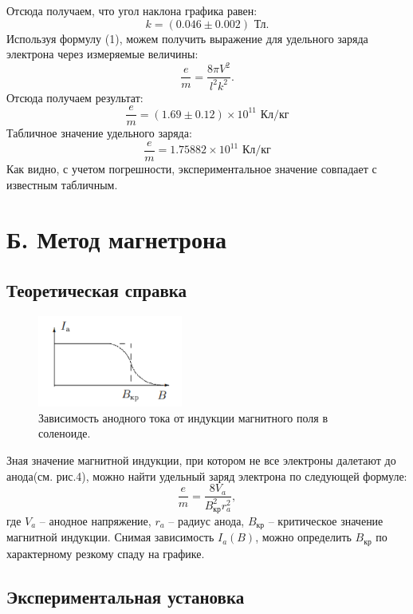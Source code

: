 \documentclass[a4paper, 14pt]{extarticle}%
\newcommand\ECaption[1]{%
     \captionsetup{font=footnotesize}%
     \caption{#1}}
\begin{document}
Отсюда получаем, что угол наклона графика равен:
\[k = (0.046\pm 0.002)\text{ Тл}.\]
Используя формулу (1), можем получить выражение для удельного заряда электрона через измеряемые величины:
\begin{equation}
\frac{e}{m}=\dfrac{8\pi V^2}{l^2k^2}.
\end{equation}
Отсюда получаем результат:
\[\frac{e}{m} =  (1.69\pm0.12) \times10^{11}    \text{ Кл/кг}\]
Табличное значение удельного заряда:
\[\frac{e}{m} =    1.75882\times10^{11}  \text{ Кл/кг}\]
Как видно, с учетом погрешности, экспериментальное значение совпадает с известным табличным.
\section*{Б. Метод магнетрона}
\subsection*{Теоретическая справка}

\begin{figure}
\begin{center}
\includegraphics[height=3cm]{teor.png}
\end{center}
\ECaption{Зависимость анодного тока от индукции магнитного поля в соленоиде.}
\end{figure}
 
Зная значение магнитной индукции, при котором не все электроны далетают до анода(см. рис.4), можно найти удельный заряд электрона по следующей формуле:
\begin{equation}
\frac{e}{m}=\dfrac{8V_a}{B^2_{\text{кр}}r^2_a},
\end{equation}
где $V_a$ -- анодное напряжение, $r_a$ -- радиус анода, $B_{\text{кр}}$ -- критическое значение магнитной индукции.
Снимая зависимость $I_a(B)$, можно определить $B_{\text{кр}}$ по характерному резкому спаду на графике.

\subsection*{Экспериментальная установка}
\end{document}
